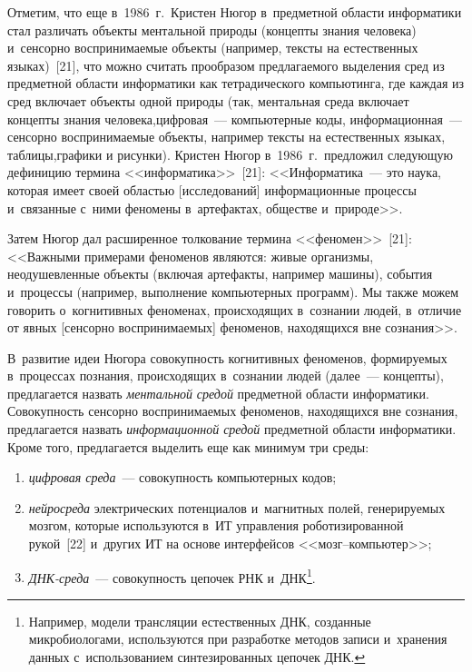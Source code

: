 {\begin{multicols}{2}
 Отметим, что еще в~1986~г.\ Кристен Нюгор 
в~предметной об\-ласти информатики стал различать объекты ментальной 
природы (концепты знания человека) и~сенсорно воспринимаемые объекты 
(например, текс\-ты на естественных языках)~[21], что мож\-но считать 
прообразом предлагаемого выделения сред из предметной об\-ласти 
информатики как тет\-ра\-ди\-че\-ско\-го компьютинга, где каждая из сред включает 
объекты одной природы (так, ментальная среда включает кон\-цеп\-ты 
знания человека,\linebreak цифровая~--- компьютерные коды, информационная~--- 
сенсорно воспринимаемые объекты, например текс\-ты на естественных 
языках, таб\-ли\-цы,\linebreak графики и рисунки). Кристен Нюгор в~1986~г.\ предложил 
сле\-ду\-ющую дефиницию термина <<информатика>>~[21]:
    <<Информатика~--- это наука, которая имеет своей об\-ластью 
[исследований] информационные процессы и~связанные с~ними феномены 
в~артефактах, обществе и~природе>>. 

Затем Нюгор дал расширенное 
толкование термина <<феномен>>~[21]: <<Важными примерами феноменов 
являются: живые организмы, неодушевленные объекты (включая артефакты, 
например \mbox{машины}), события и~процессы (например, выполнение 
компьютерных программ). Мы также можем говорить о~когнитивных 
феноменах, происходящих в~сознании людей, в~отличие от яв\-ных [сенсорно 
воспринимаемых] феноменов, находящихся вне сознания>>.
  
  В~развитие идеи Нюгора совокупность когнитивных феноменов, 
формируемых в~процессах познания, происходящих в~сознании людей 
(далее~--- кон\-цеп\-ты), предлагается назвать \textit{ментальной} \mbox{\textit{средой}} 
предметной области информатики. Со\-во\-куп\-ность сенсорно вос\-при\-ни\-ма\-емых 
феноменов, находящихся вне сознания, предлагается назвать 
\textit{информационной средой} предметной об\-ласти информатики. Кроме 
того, предлагается выделить еще как минимум три среды:
  \begin{enumerate}[(1)]
  \item \textit{цифровая среда}~--- совокупность компьютерных кодов;
  \item \textit{нейросреда} электрических потенциалов и~магнитных полей, 
ге\-не\-ри\-ру\-емых мозгом, которые используются в~ИТ управ\-л\-ения 
роботизированной рукой~[22] и~других ИТ на основе интерфейсов  
<<мозг--компь\-ютер>>;
  \item \textit{ДНК-среда}~--- совокупность цепочек РНК 
и~ДНК\footnote{Например, модели трансляции естественных ДНК, 
созданные микробиологами, используются при разработке методов записи 
и~хранения данных с~использованием синтезированных цепочек ДНК.}.
  \end{enumerate}
  

\end{multicols}}
